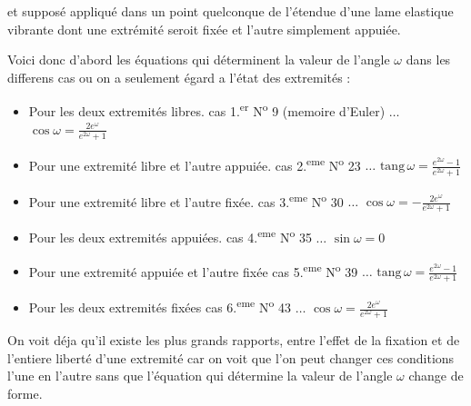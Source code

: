 \documentclass[11pt,a4paper]{article}
\begin{document}
et supposé appliqué dans un point quelconque de l'étendue d'une lame
elastique vibrante dont une extrémité seroit fixée et l'autre simplement
appuiée.

Voici donc d'abord les équations qui déterminent la valeur de l'angle
$\omega$ dans les differens cas ou on a seulement égard a l'état des
extremités :

\begin{itemize}
\item Pour les deux extremités libres. cas 1.\textsuperscript{er} N\textsuperscript{o} 9 (memoire d'Euler) $\ldots$ $\cos\omega=\frac{2e^{\omega}}{e^{2\omega}+1}$
\item Pour une extremité libre et l'autre appuiée. cas 2.\textsuperscript{eme} N\textsuperscript{o} 23 $\ldots$ $\text{tang}\,\omega=\frac{e^{2\omega}-1}{e^{2\omega}+1}$
\item Pour une extremité libre et l'autre fixée. cas 3.\textsuperscript{eme} N\textsuperscript{o} 30 $\ldots$ $\cos\omega=-\frac{2e^{\omega}}{e^{2\omega}+1}$
\item Pour les deux extremités appuiées. cas 4.\textsuperscript{eme} N\textsuperscript{o} 35 $\ldots$ $\sin\omega=0$
\item Pour une extremité appuiée et l'autre fixée cas 5.\textsuperscript{eme} N\textsuperscript{o} 39 $\ldots$ $\text{tang}\,\omega=\frac{e^{2\omega}-1}{e^{2\omega}+1}$
\item Pour les deux extremités fixées cas 6.\textsuperscript{eme} N\textsuperscript{o} 43 $\ldots$ $\cos\omega=\frac{2e^{\omega}}{e^{2\omega}+1}$
\end{itemize}

On  voit déja  qu'il existe les plus grands
 rapports, entre l'effet de la fixation et de l'entiere
liberté d'une extremité car on voit que l'on peut changer ces conditions
l'une en l'autre sans que l'équation qui détermine la valeur de l'angle
$\omega$ change de forme.
\end{document}
